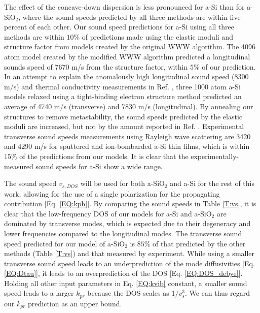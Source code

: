 The effect of the concave-down dispersion
is less pronounced for a-Si than for a-SiO$_2$, where the sound speeds 
predicted by all three methods are within five percent of each other. 
Our sound speed predictions for a-Si using all three methods
are within $10\%$ of predictions made using the elastic moduli
\cite{kluge_elastic_1988,feldman_elastic_1991} 
and structure factor\cite{feldman_calculations_2002} 
from models created by the original WWW algorithm.
\cite{wooten_computer_1985} 
The 4096 atom model created by the modified WWW algorithm 
\cite{barkema_high-quality_2000} predicted a longitudinal sounds 
speed of 7670 m/s from the structure factor,
\cite{christie_vibrational_2007} within $5\%$ of our prediction. 
In an attempt to explain the 
anomalously high longitudinal sound speed (8300 m/s) and 
thermal conductivity measurements in Ref. , 
three 1000 atom a-Si models relaxed using a tight-binding electron 
structure method predicted an average of 4740 m/s (transverse) and 
7830 m/s (longitudinal).\cite{liu_high_2009} By annealing our 
structures to remove metastability, 
the sound speeds predicted by the elastic moduli are increased, but 
not by the amount reported in Ref. . 
Experimental transverse sound speeds measurements using Rayleigh wave 
scattering are 3420 and 4290 m/s for sputtered 
and ion-bombarded a-Si thin films,\cite{vacher_attenuation_1980} which 
is within $15\%$ of the predictions from our models. It is clear that 
the experimentally-measured sound speeds for a-Si show a wide range.

The sound speed $v_{s,DOS}$ will be used for both 
a-SiO$_2$ and a-Si for the rest of this work, allowing 
for the use of a single polarization for the propagating 
contribution [Eq. \eqref{EQ:kph}]. 
By comparing the sound speeds in Table \ref{T:vs}, it is clear that 
the low-frequency DOS of our models for a-Si and a-SiO$_2$ are 
dominated by 
transverse modes, which is expected due to their degeneracy and lower 
frequencies compared to the longitudinal modes.  
The transverse sound speed predicted for our model of 
a-SiO$_2$ is $85\%$ of that predicted by 
the other methods (Table \ref{T:vs}) and that measured by experiment.
\cite{vacher_ultrasonic_1981,benassi_evidence_1996,
ruocco_high-frequency_2001,polian_elastic_2002,
ruzicka_evidence_2004} 
While using a smaller transverse sound speed 
leads to an underprediction of the
mode diffusivities [Eq. \eqref{EQ:Dtau}], it leads to an
overprediction of the DOS [Eq. \eqref{EQ:DOS_debye}]. 
Holding all other input parameters in Eq. \eqref{EQ:kvib} constant,
a smaller sound speed leads to a larger $k_{pr}$ 
because the DOS scales as $1/v^3_{s}$. We can thus regard
our $k­_{pr}$ prediction as an upper bound.

